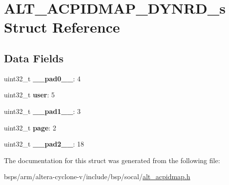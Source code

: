 \hypertarget{structALT__ACPIDMAP__DYNRD__s}{}\section{A\+L\+T\+\_\+\+A\+C\+P\+I\+D\+M\+A\+P\+\_\+\+D\+Y\+N\+R\+D\+\_\+s Struct Reference}
\label{structALT__ACPIDMAP__DYNRD__s}
\subsection*{Data Fields}
\begin{DoxyCompactItemize}
\item 
\mbox{\label{structALT__ACPIDMAP__DYNRD__s_a04dcf04824046799486800c15a98ccea}} 
uint32\+\_\+t {\bfseries \+\_\+\+\_\+pad0\+\_\+\+\_\+}\+: 4
\item 
\mbox{\label{structALT__ACPIDMAP__DYNRD__s_a3da875acf294e4f3470c8b65dfb887a8}} 
uint32\+\_\+t {\bfseries user}\+: 5
\item 
\mbox{\label{structALT__ACPIDMAP__DYNRD__s_a89e30de09aa1fe847e2d737b2a315c51}} 
uint32\+\_\+t {\bfseries \+\_\+\+\_\+pad1\+\_\+\+\_\+}\+: 3
\item 
\mbox{\label{structALT__ACPIDMAP__DYNRD__s_a786251adad25bf1331d77f4aa610ce84}} 
uint32\+\_\+t {\bfseries page}\+: 2
\item 
\mbox{\label{structALT__ACPIDMAP__DYNRD__s_a7c244af931ea455cb24f525e08ec4419}} 
uint32\+\_\+t {\bfseries \+\_\+\+\_\+pad2\+\_\+\+\_\+}\+: 18
\end{DoxyCompactItemize}


The documentation for this struct was generated from the following file\+:\begin{DoxyCompactItemize}
\item 
bsps/arm/altera-\/cyclone-\/v/include/bsp/socal/\mbox{\hyperlink{alt__acpidmap_8h}{alt\+\_\+acpidmap.\+h}}\end{DoxyCompactItemize}
